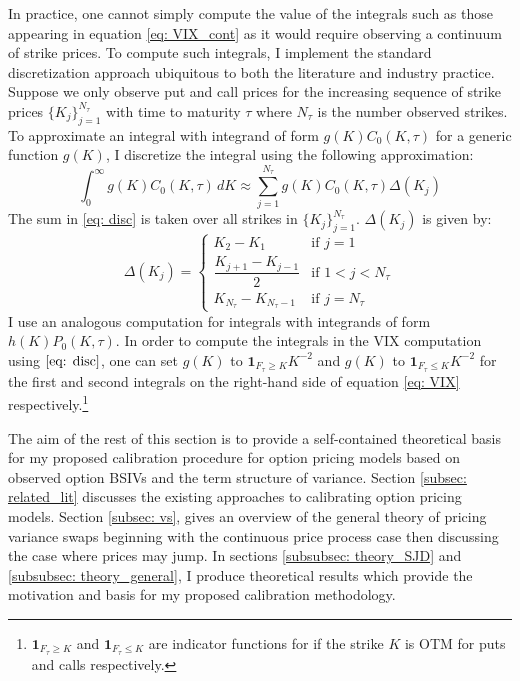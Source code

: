 \documentclass[12pt]{article}
\begin{document}
In practice, one cannot simply compute the value of the integrals such as those appearing in equation \eqref{eq: VIX_cont} as it would require observing a continuum of strike prices. To compute such integrals, I implement the standard discretization approach ubiquitous to both the literature and industry practice. Suppose we only observe put and call prices for the increasing sequence of strike prices $\lbrace K_j\rbrace_{j=1}^{N_\tau}$ with time to maturity $\tau$ where $N_\tau$ is the number observed strikes. To approximate an integral with integrand of form $g(K)C_0(K,\tau)$ for a generic function $g(K)$, I discretize the integral using the following approximation:
\begin{equation}\label{eq: disc}
  \int_{0}^{\infty} g(K)C_0(K, \tau) \, dK  \approx   \sum\limits_{j=1}^{N_\tau } g(K)C_0(K, \tau)\Delta(K_j)
\end{equation}
The sum in \eqref{eq: disc} is taken over all strikes in $\lbrace K_j\rbrace_{j=1}^{N_\tau }$. $\Delta(K_j)$ is given by:
\begin{equation}
    \Delta(K_j) = \begin{cases}
K_2 - K_1 & \text{if }j = 1 \\
\dfrac{K_{j+1} - K_{j-1}}{2}   & \text{if } 1 < j < N_\tau \\
K_{N_\tau } - K_{N_\tau -1} & \text{if } j = N_\tau 
\end{cases}
\end{equation} 
I use an analogous computation for integrals with integrands of form $h(K)P_0(K,\tau)$. In order to compute the integrals in the VIX computation using $\eqref{eq: disc}$, one can set $g(K)$ to $\textbf{1}_{F_\tau \geq K}K^{-2}$ and $g(K)$ to $\textbf{1}_{F_\tau \leq K}K^{-2}$ for the first and second integrals on the right-hand side of equation \eqref{eq: VIX} respectively.\footnote{$\textbf{1}_{F_\tau \geq K}$ and $\textbf{1}_{F_\tau \leq K}$ are indicator functions for if the strike $K$ is OTM for puts and calls respectively.} 

The aim of the rest of this section is to provide a self-contained theoretical basis for my proposed calibration procedure for option pricing models based on observed option BSIVs and the term structure of variance. Section \ref{subsec: related_lit} discusses the existing approaches to calibrating option pricing models. Section \ref{subsec: vs}, gives an overview of the general theory of pricing variance swaps beginning with the continuous price process case then discussing the case where prices may jump. In sections \ref{subsubsec: theory_SJD} and \ref{subsubsec: theory_general}, I produce theoretical results which provide the motivation and basis for my proposed calibration methodology.
\end{document}
